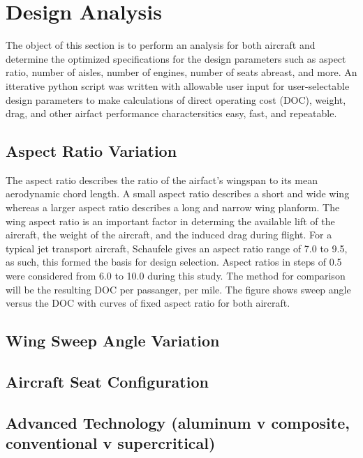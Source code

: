 \documentclass{article}
\begin{document}
\section{Design Analysis}
    \begin{flushleft}
        The object of this section is to perform an analysis for both aircraft
        and determine the optimized specifications for the design parameters
        such as aspect ratio, number of aisles, number of engines, number of
        seats abreast, and more. An itterative python script was written with
        allowable user input for user-selectable design parameters to make
        calculations of direct operating cost (DOC), weight, drag, and other
        airfact performance charactersitics easy, fast, and repeatable.
    \end{flushleft}

    \subsection{Aspect Ratio Variation}
        \begin{flushleft}
            The aspect ratio describes the ratio of the airfact's wingspan to
            its mean aerodynamic chord length. A small aspect ratio describes a
            short and wide wing whereas a larger aspect ratio describes a long
            and narrow wing planform. The wing aspect ratio is an important
            factor in determing the available lift of the aircraft, the weight
            of the aircraft, and the induced drag during flight. For a typical
            jet transport aircraft, Schaufele gives an aspect ratio range of 7.0
            to 9.5, as such, this formed the basis for design selection. Aspect
            ratios in steps of 0.5 were considered from 6.0 to 10.0 during this
            study. The method for comparison will be the resulting DOC per
            passanger, per mile. The figure shows sweep angle versus
            the DOC with curves of fixed aspect ratio for both aircraft.
        \end{flushleft}
    \subsection{Wing Sweep Angle Variation}
    \subsection{Aircraft Seat Configuration}
    \subsection{Advanced Technology (aluminum v composite, conventional v supercritical)}
\end{document}
